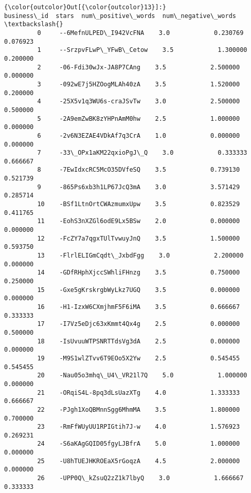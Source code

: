 \documentclass[11pt]{article}
\begin{document}
\begin{Verbatim}[commandchars=\\\{\}]
{\color{outcolor}Out[{\color{outcolor}13}]:}                  business\_id  stars  num\_positive\_words  num\_negative\_words  \textbackslash{}
         0     --6MefnULPED\_I942VcFNA    3.0            0.230769            0.076923   
         1     --SrzpvFLwP\_YFwB\_Cetow    3.5            1.300000            0.200000   
         2     -06-Fdi30wJx-JA8P7CAng    3.5            2.500000            0.000000   
         3     -092wE7j5HZOogMLAh40zA    3.5            1.520000            0.200000   
         4     -25X5v1q3WU6s-craJSvTw    3.0            2.500000            0.500000   
         5     -2A9emZwBK8zYHPnAmM0hw    2.5            1.000000            0.000000   
         6     -2v6N3EZAE4VDkAf7q3CrA    1.0            0.000000            0.000000   
         7     -33\_OPx1aKM22qxioPgJ\_Q    3.0            0.333333            0.666667   
         8     -7EwIdxcRC5McO35DVfeSQ    3.5            0.739130            0.521739   
         9     -865Ps6xb3h1LP67JcQ3mA    3.0            3.571429            0.285714   
         10    -BSf1LtnOrtCWAzmumxUpw    3.5            0.823529            0.411765   
         11    -EohS3nXZGl6odE9Lx5BSw    2.0            0.000000            0.000000   
         12    -FcZY7a7qgxTUlTvwuyJnQ    3.5            1.500000            0.593750   
         13    -FlrlELIGmCqdt\_JxbdFgg    3.0            2.200000            0.000000   
         14    -GDfRHphXjccSWhliFHnzg    3.5            0.750000            0.250000   
         15    -Gxe5gKrskrgbWyLkz7UGQ    3.5            0.000000            0.000000   
         16    -H1-IzxW6CXmjhmF5F6iMA    3.5            0.666667            0.333333   
         17    -I7Vz5eDjc63xKmmt4Qx4g    2.5            0.000000            0.500000   
         18    -IsUvuuWTPSNRTTdsVg3dA    2.5            0.000000            0.000000   
         19    -M9S1wlZTvv6T9EOo5X2Yw    2.5            0.545455            0.545455   
         20    -Nau05o3mhq\_U4\_VR21l7Q    5.0            1.000000            0.000000   
         21    -ORqiS4L-8pq3dLsUazXTg    4.0            1.333333            0.666667   
         22    -PJgh1XoQBMnnSgg6MhmMA    3.5            1.800000            0.700000   
         23    -RmFfWUyUU1RPIGtih7J-w    4.0            1.576923            0.269231   
         24    -S6aKAgGQID05fgyLJBfrA    5.0            1.000000            0.000000   
         25    -U8hTUEJHKROEaX5rGoqzA    4.5            2.000000            0.000000   
         26    -UPP0Q\_kZsuQ2zZ1k7lbyQ    3.0            1.666667            0.333333   

\end{Verbatim}
\end{document}
